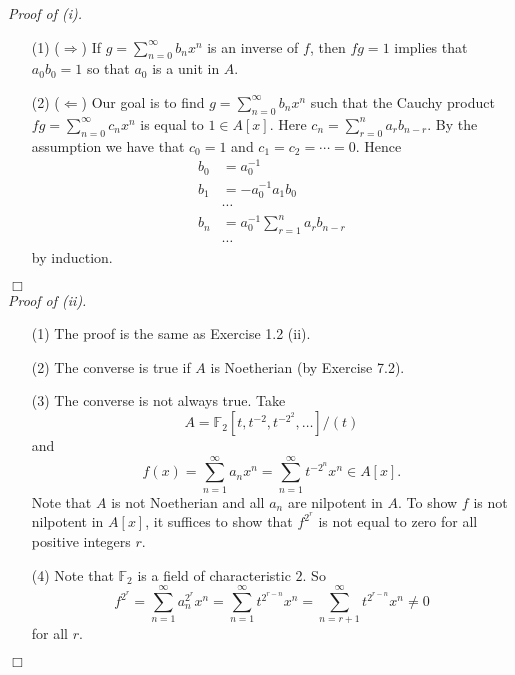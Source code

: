 \documentclass{article}
\begin{document}
\emph{Proof of (i).}
\begin{enumerate}
\item[(1)]
  ($\Longrightarrow$)
  If $g = \sum_{n=0}^{\infty} b_n x^n$ is an inverse of $f$,
  then $fg = 1$ implies that $a_0 b_0 = 1$ so that $a_0$ is a unit in $A$.

\item[(2)]
  ($\Longleftarrow$)
  Our goal is to find $g = \sum_{n=0}^{\infty} b_n x^n$
  such that the Cauchy product
  $fg = \sum_{n=0}^{\infty} c_n x^n$
  is equal to $1 \in A[x]$.
  Here $c_n = \sum_{r = 0}^{n} a_{r} b_{n-r}$.
  By the assumption we have that $c_0 = 1$ and $c_1 = c_2 = \cdots = 0$.
  Hence
  \begin{align*}
    b_0 &= a_0^{-1} \\
    b_1 &= -a_0^{-1} a_1 b_0 \\
    & \cdots \\
    b_n &= a_0^{-1} \sum_{r = 1}^{n} a_r b_{n-r} \\
    & \cdots
  \end{align*}
  by induction.
\end{enumerate}
$\Box$ \\



\emph{Proof of (ii).}
\begin{enumerate}
\item[(1)]
  The proof is the same as Exercise 1.2 (ii).

\item[(2)]
  The converse is true if $A$ is Noetherian (by Exercise 7.2).

\item[(3)]
  The converse is not always true.
  Take
  \[
    A = \mathbb{F}_2[t, t^{-2}, t^{-2^2}, \ldots]/(t)
  \]
  and
  \[
    f(x)
    = \sum_{n=1}^{\infty} a_n x^n
    = \sum_{n=1}^{\infty} t^{-2^n} x^n \in A[x].
  \]
  Note that $A$ is not Noetherian and all $a_n$ are nilpotent in $A$.
  To show $f$ is not nilpotent in $A[x]$, it suffices to show that
  $f^{2^r}$ is not equal to zero for all positive integers $r$.

\item[(4)]
  Note that $\mathbb{F}_2$ is a field of characteristic $2$.
  So
  \[
    f^{2^r}
    = \sum_{n=1}^{\infty} a_n^{2^r} x^n
    = \sum_{n=1}^{\infty} t^{2^{r-n}} x^n
    = \sum_{n=r+1}^{\infty} t^{2^{r-n}} x^n
    \neq 0
  \]
  for all $r$.
\end{enumerate}
$\Box$ \\
\end{document}
